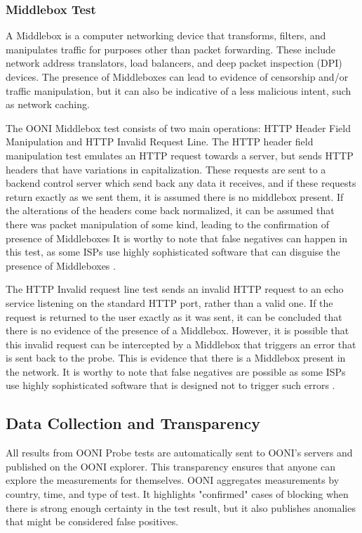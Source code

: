 \subsubsection{Middlebox Test}

A Middlebox is a computer networking device that transforms, filters, and manipulates traffic for purposes other than packet forwarding. These include network address translators, load balancers, and deep packet inspection (DPI) devices. The presence of Middleboxes can lead to evidence of censorship and/or traffic manipulation, but it can also be indicative of a less malicious intent, such as network caching.

The OONI Middlebox test consists of two main operations: HTTP Header Field Manipulation and HTTP Invalid Request Line. The HTTP header field manipulation test emulates an HTTP request towards a server, but sends HTTP headers that have variations in capitalization. These requests are sent to a backend control server which send back any data it receives, and if these requests return exactly as we sent them, it is assumed there is no middlebox present. If the alterations of the headers come back normalized, it can be assumed that there was packet manipulation of some kind, leading to the confirmation of presence of Middleboxes It is worthy to note that false negatives can happen in this test, as some ISPs use highly sophisticated software that can disguise the presence of Middleboxes \cite{ooniHTTPHeader}.  

The HTTP Invalid request line test sends an invalid HTTP request to an echo service listening on the standard HTTP port, rather than a valid one. If the request is returned to the user exactly as it was sent, it can be concluded that there is no evidence of the presence of a Middlebox. However, it is possible that this invalid request can be intercepted by a Middlebox that triggers an error that is sent back to the probe. This is evidence that there is a Middlebox present in the network. It is worthy to note that false negatives are possible as some ISPs use highly sophisticated software that is designed not to trigger such errors \cite{ooniHTTPInvalid}. 

\subsection{Data Collection and Transparency}
All results from OONI Probe tests are automatically sent to OONI's servers and published on the OONI explorer. This transparency ensures that anyone can explore the measurements for themselves. OONI aggregates measurements by country, time, and type of test. It highlights "confirmed" cases of blocking when there is strong enough certainty in the test result, but it also publishes anomalies that might be considered false positives. 

